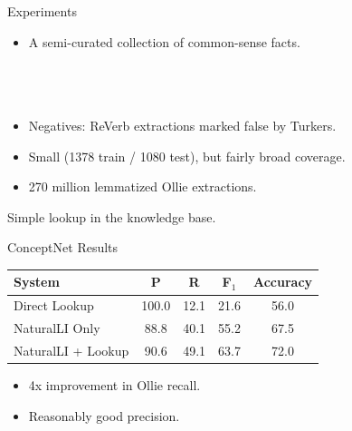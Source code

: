 \documentclass[hyperref]{beamer}
\begin{document}
\begin{frame}{Experiments}
\begin{itemize}
  \item A semi-curated collection of common-sense facts. \\
    \vspace{0.1cm}
    \pause
     \\
     \\
     \\
    \vspace{0.1cm}
  \pause
  \item Negatives: ReVerb extractions marked false by Turkers.
  \pause
  \item Small (1378 train / 1080 test), but fairly broad coverage.
\end{itemize}
\vspace{0.5cm}
\pause

\begin{itemize}
  \item 270 million lemmatized Ollie extractions.
\end{itemize}
\vspace{0.5cm}
\pause

 Simple lookup in the knowledge base.
\end{frame}
  
\begin{frame}{ConceptNet Results}
\begin{center}
  \begin{tabular}{l|cc:c|c}
    System             & P     & R    & F$_1$  & Accuracy \\
    \hline
    Direct Lookup      & 100.0 & 12.1 & 21.6 & 56.0 \\
    NaturalLI Only     & 88.8  & 40.1 & 55.2 & 67.5 \\
    NaturalLI + Lookup & 90.6  & 49.1 & 63.7 & 72.0  \\
  \end{tabular}
\end{center}
\pause

\begin{itemize}
  \item 4x improvement in Ollie recall.
  \pause
  \item Reasonably good precision.
\end{itemize}
\end{frame}
\end{document}
